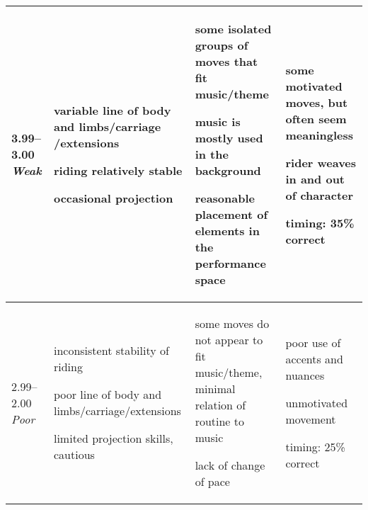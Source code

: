 \begin{longtable}{|p{1.5cm}|p{5.5cm}|p{5.5cm}|p{5.5cm}|}
3.99--3.00 \newline
\emph{Weak} &

\begin{judging_items}%
\item variable line of body and limbs/carriage /extensions
\item riding relatively stable
\item occasional projection
\end{judging_items} &

\begin{judging_items}%
\item some isolated groups of moves that fit music/theme
\item music is mostly used in the background
\item reasonable placement of elements in the performance space
\end{judging_items} &

\begin{judging_items}%
\item some motivated moves, but often seem meaningless
\item rider weaves in and out of character
\item timing: 35\% correct
\end{judging_items} \\
\hline

2.99--2.00 \newline
\emph{Poor} &

\begin{judging_items}%
\item inconsistent stability of riding
\item poor line of body and limbs/carriage/extensions
\item limited projection skills, cautious
\end{judging_items} &

\begin{judging_items}%
\item some moves do not appear to fit music/theme, minimal relation of routine to music
\item lack of change of pace
\end{judging_items} &

\begin{judging_items}%
\item poor use of accents and nuances
\item unmotivated movement
\item timing: 25\% correct 
\end{judging_items} \\
\hline


\end{longtable}
